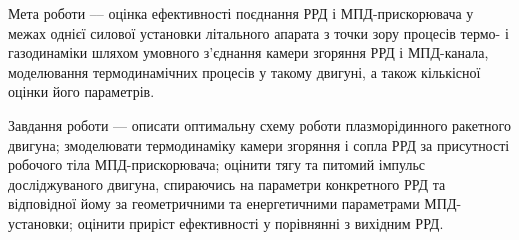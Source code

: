 Мета роботи –-- оцінка ефективності поєднання РРД і МПД-прискорювача у межах однієї силової установки літального апарата з точки зору процесів термо- і газодинаміки шляхом умовного з'єднання камери згоряння РРД і МПД-канала, моделювання термодинамічних процесів у такому двигуні, а також кількісної оцінки його параметрів.

Завдання роботи –-- описати оптимальну схему роботи плазморідинного ракетного двигуна; змоделювати термодинаміку камери згоряння і сопла РРД за присутності робочого тіла МПД-прискорювача; оцінити тягу та питомий імпульс досліджуваного двигуна, спираючись на параметри конкретного РРД та відповідної йому за геометричними та енергетичними параметрами МПД-установки; оцінити приріст ефективності у порівнянні з вихідним РРД. 
